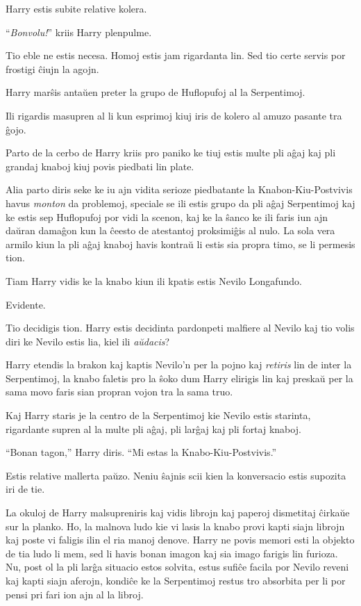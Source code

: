 Harry estis subite relative kolera.

``\emph{Bonvolu!}'' kriis Harry plenpulme.

Tio eble ne estis necesa. Homoj estis jam rigardanta lin. Sed tio certe servis
por frostigi ĉiujn la agojn.

Harry marŝis antaŭen preter la grupo de Huflopufoj al la Serpentimoj.

Ili rigardis masupren al li kun esprimoj kiuj iris de kolero al amuzo pasante
tra ĝojo.

Parto de la cerbo de Harry kriis pro paniko ke tiuj estis multe pli
aĝaj kaj pli grandaj knaboj kiuj povis piedbati lin plate.

Alia parto diris seke ke iu ajn vidita serioze piedbatante la
Knabon-Kiu-Postvivis havus \emph{monton} da problemoj, speciale se ili estis
grupo da pli aĝaj Serpentimoj kaj ke estis sep Huflopufoj por vidi la scenon,
kaj ke la ŝanco ke ili faris iun ajn daŭran damaĝon kun la ĉeesto de atestantoj
proksimiĝis al nulo. La sola vera armilo kiun la pli aĝaj knaboj havis kontraŭ li
estis sia propra timo, se li permesis tion.

Tiam Harry vidis ke la knabo kiun ili kpatis estis Nevilo Longafundo.

Evidente.

Tio decidigis tion. Harry estis decidinta pardonpeti malfiere al Nevilo kaj tio
volis diri ke Nevilo estis lia, kiel ili \emph{aŭdacis}?

Harry etendis la brakon kaj kaptis Nevilo'n per la pojno kaj
\emph{retiris} lin de inter la Serpentimoj, la knabo faletis pro la
ŝoko dum Harry elirigis lin kaj preskaŭ per la sama movo faris
sian propran vojon tra la sama truo.

Kaj Harry staris je la centro de la Serpentimoj kie Nevilo estis
starinta, rigardante supren al la multe pli aĝaj, pli larĝaj kaj
pli fortaj knaboj.

``Bonan tagon,'' Harry diris. ``Mi estas la Knabo-Kiu-Postvivis.''

Estis relative mallerta paŭzo. Neniu ŝajnis scii kien la
konversacio estis supozita iri de tie.

La okuloj de Harry malsupreniris kaj vidis librojn kaj paperoj dismetitaj
ĉirkaŭe sur la planko. Ho, la malnova ludo kie vi lasis la knabo provi kapti
siajn librojn kaj poste vi faligis ilin el ria manoj denove. Harry ne povis
memori esti la objekto de tia ludo li mem, sed li havis bonan imagon kaj sia
imago farigis lin furioza. Nu, post ol la pli larĝa situacio estos solvita,
estus sufiĉe facila por Nevilo reveni kaj kapti siajn aferojn, kondiĉe ke la
Serpentimoj restus tro absorbita per li por pensi pri fari ion ajn al la libroj.

